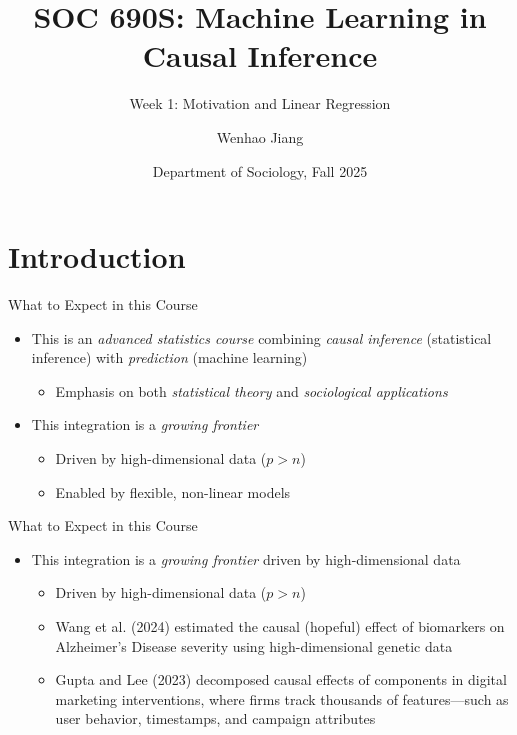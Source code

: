 \documentclass[aspectratio=1610,12pt,xcolor=dvipsnames]{beamer}
\title[CML]{SOC 690S: Machine Learning in Causal Inference\\[1.5pt]}
\subtitle{\large Week 1: Motivation and Linear Regression\\[-10pt]}
\author[Jiang] 
{\large Wenhao Jiang\vspace{-2em}}
\institute[Duke]{}
\date[Duke]
{\large Department of Sociology, Fall 2025}
\begin{document}

\begin{frame}
    \titlepage 
\end{frame}

\section{Introduction}

\begin{frame}
  \sectionpage
\end{frame}

\begin{frame}{What to Expect in this Course}
\begin{itemize}
    \item This is an \textit{advanced statistics course} combining 
    \textit{causal inference} (statistical inference) 
    with \textit{prediction} (machine learning)
    \begin{itemize}
        \item Emphasis on both \textit{statistical theory} and \textit{sociological applications}
    \end{itemize} \pause
    \item This integration is a \textit{growing frontier}
    \begin{itemize}
        \item Driven by high-dimensional data ($p>n$)
        \item Enabled by flexible, non-linear models
    \end{itemize}
    \end{itemize}
\end{frame}

\begin{frame}{What to Expect in this Course}
\begin{itemize}
    \item This integration is a \textit{growing frontier} driven by high-dimensional data
    \begin{itemize}
        \item Driven by high-dimensional data ($p>n$)
        \item Wang et al. (2024) estimated the causal (hopeful) effect of biomarkers on Alzheimer’s Disease severity using high-dimensional genetic data
        \item Gupta and Lee (2023) decomposed causal effects of components in digital marketing interventions, where firms track thousands of features—such as user behavior, timestamps, and campaign attributes
    \end{itemize}
    \end{itemize}
\end{frame}
\end{document}
